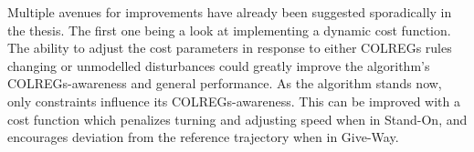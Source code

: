 Multiple avenues for improvements have already been suggested sporadically in the thesis. The first one being a look at implementing a dynamic cost function.
The ability to adjust the cost parameters in response to either COLREGs rules changing or unmodelled disturbances could
greatly improve the algorithm's COLREGs-awareness and general performance. As the algorithm stands now, only constraints influence its COLREGs-awareness. This can be improved with a
cost function which penalizes turning and adjusting speed when in Stand-On, and encourages deviation from the reference trajectory when in Give-Way.

